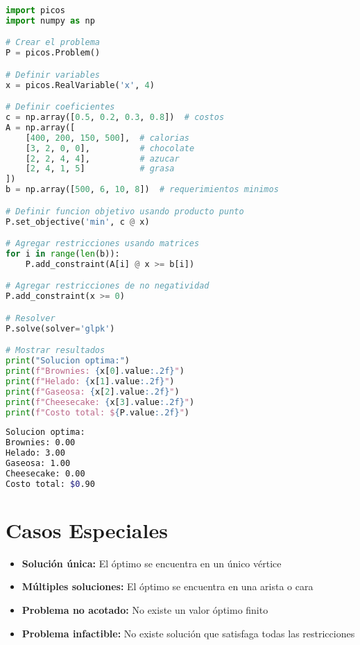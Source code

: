 \documentclass[12pt]{article}
\begin{document}
\begin{lstlisting}[language=Python]
import picos
import numpy as np

# Crear el problema
P = picos.Problem()

# Definir variables
x = picos.RealVariable('x', 4)

# Definir coeficientes
c = np.array([0.5, 0.2, 0.3, 0.8])  # costos
A = np.array([
    [400, 200, 150, 500],  # calorias
    [3, 2, 0, 0],          # chocolate
    [2, 2, 4, 4],          # azucar
    [2, 4, 1, 5]           # grasa
])
b = np.array([500, 6, 10, 8])  # requerimientos minimos

# Definir funcion objetivo usando producto punto
P.set_objective('min', c @ x)

# Agregar restricciones usando matrices
for i in range(len(b)):
    P.add_constraint(A[i] @ x >= b[i])

# Agregar restricciones de no negatividad
P.add_constraint(x >= 0)

# Resolver
P.solve(solver='glpk')

# Mostrar resultados
print("Solucion optima:")
print(f"Brownies: {x[0].value:.2f}")
print(f"Helado: {x[1].value:.2f}")
print(f"Gaseosa: {x[2].value:.2f}")
print(f"Cheesecake: {x[3].value:.2f}")
print(f"Costo total: ${P.value:.2f}")
\end{lstlisting}

\begin{lstlisting}[language=bash,backgroundcolor=\color{black},basicstyle=\color{white}\ttfamily,numbers=none]
Solucion optima:
Brownies: 0.00
Helado: 3.00
Gaseosa: 1.00
Cheesecake: 0.00
Costo total: $0.90
\end{lstlisting}

\section{Casos Especiales}
\begin{itemize}
    \item \textbf{Solución única:} El óptimo se encuentra en un único vértice
    \item \textbf{Múltiples soluciones:} El óptimo se encuentra en una arista o cara
    \item \textbf{Problema no acotado:} No existe un valor óptimo finito
    \item \textbf{Problema infactible:} No existe solución que satisfaga todas las restricciones
\end{itemize}
\end{document}
